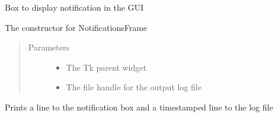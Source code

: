 \documentclass[letterpaper,10pt,english,openany,oneside]{sphinxmanual}
\begin{document}
\begin{fulllineitems}
\label{\detokenize{src/notificationsframe:NotificationsFrame.NotificationFrame}}
Box to display notification in the GUI

\begin{fulllineitems}
\label{\detokenize{src/notificationsframe:NotificationsFrame.NotificationFrame.__init__}}
The constructor for NotificationsFrame
\begin{quote}\begin{description}
\item[{Parameters}] \leavevmode\begin{itemize}
\item {} 
 \textendash{} The Tk parent widget

\item {} 
 \textendash{} The file handle for the output log file

\end{itemize}

\end{description}\end{quote}

\end{fulllineitems}


\begin{fulllineitems}
\label{\detokenize{src/notificationsframe:NotificationsFrame.NotificationFrame.append_line}}
Prints a line to the notification box and 
a timestamped line to the log file

\end{fulllineitems}


\end{fulllineitems}
\end{document}
